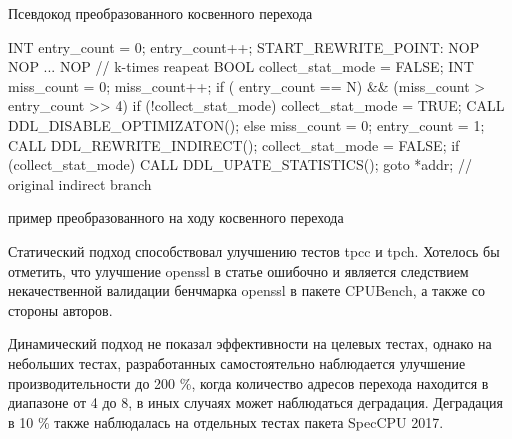 \begin{ListingEnv}[!h]
	\captiondelim{ } %
	\caption{Псевдокод преобразованного косвенного перехода}\label{indirect_algo1}
	
	\begin{Verb}
		
		INT entry_count = 0;
		entry_count++;
		START_REWRITE_POINT:
		NOP
		NOP
		...
		NOP // k-times reapeat
		BOOL collect_stat_mode = FALSE;
		INT miss_count = 0;
		miss_count++;
		if ( entry_count == N)
		&& (miss_count > entry_count >> 4) {
			if (!collect_stat_mode){
				collect_stat_mode = TRUE;
				CALL DDL_DISABLE_OPTIMIZATON();
			} else {
				miss_count = 0;
				entry_count = 1;
				CALL DDL_REWRITE_INDIRECT();
				collect_stat_mode = FALSE;
			}
		}
		if (collect_stat_mode) {
			CALL DDL_UPATE_STATISTICS();
		}
		goto *addr; // original indirect branch
		
	\end{Verb}
\end{ListingEnv} 


\begin{ListingEnv}[!h]
	\captiondelim{ } %
	\caption{пример преобразованного на ходу косвенного перехода}\label{indirect_algo2}
	
\end{ListingEnv} 

Статический подход способствовал улучшению тестов tpcc и tpch. Хотелось бы отметить, что улучшение openssl в статье \cite{chernonog2023статический} ошибочно и является следствием некачественной валидации бенчмарка openssl в пакете CPUBench, а также со стороны авторов.

Динамический подход не показал эффективности на целевых тестах, однако на небольших тестах, разработанных самостоятельно наблюдается улучшение производительности до 200 \%, когда количество адресов перехода находится в диапазоне от 4 до 8, в иных случаях может наблюдаться деградация. Деградация в 10 \% также наблюдалась на отдельных тестах пакета SpecCPU 2017.

